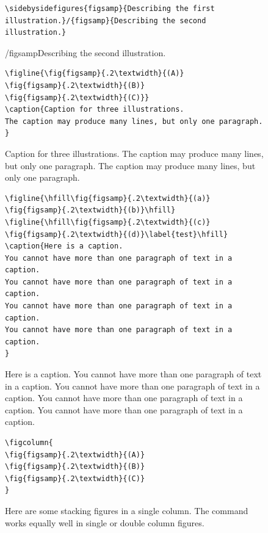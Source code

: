 \documentclass[reprint]{JASA}
\begin{document}
\begin{figure}
\baselineskip=12pt
\begin{verbatim}
\sidebysidefigures{figsamp}{Describing the first
illustration.}/{figsamp}{Describing the second illustration.}
\end{verbatim}

/{figsamp}{Describing the second illustration.}

\baselineskip=12pt
\begin{verbatim}
\figline{\fig{figsamp}{.2\textwidth}{(A)}
\fig{figsamp}{.2\textwidth}{(B)}
\fig{figsamp}{.2\textwidth}{(C)}}
\caption{Caption for three illustrations. 
The caption may produce many lines, but only one paragraph.
}
\end{verbatim}
\caption{Caption for three illustrations. 
The caption may produce many lines, but only one paragraph.  The caption may produce many lines, but only one paragraph.
}
\end{figure}

\begin{figure}
\baselineskip=12pt
\begin{verbatim}
\figline{\hfill\fig{figsamp}{.2\textwidth}{(a)}
\fig{figsamp}{.2\textwidth}{(b)}\hfill}
\figline{\hfill\fig{figsamp}{.2\textwidth}{(c)}
\fig{figsamp}{.2\textwidth}{(d)}\label{test}\hfill}
\caption{Here is a caption.
You cannot have more than one paragraph of text in a caption.
You cannot have more than one paragraph of text in a caption.
You cannot have more than one paragraph of text in a caption.
You cannot have more than one paragraph of text in a caption.
}
\end{verbatim}
\caption{Here is a caption.
You cannot have more than one paragraph of text in a caption.
You cannot have more than one paragraph of text in a caption.
You cannot have more than one paragraph of text in a caption.
You cannot have more than one paragraph of text in a caption.
}
\vskip1in
\end{figure}
\clearpage
\begin{figure}[h]
\baselineskip=12pt
\begin{verbatim}
\figcolumn{
\fig{figsamp}{.2\textwidth}{(A)}
\fig{figsamp}{.2\textwidth}{(B)}
\fig{figsamp}{.2\textwidth}{(C)}
}
\end{verbatim}


\caption{Here are some stacking figures in a single column. 
The {\tt\string\figcolumn\string{\string}} command works equally well in single
or double column figures.}
\end{figure}
\end{document}
